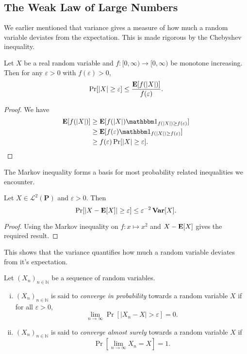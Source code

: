 \subsection{The Weak Law of Large Numbers}

We earlier mentioned that variance gives a measure of how much a random variable deviates from the expectation. This is made rigorous by the Chebyshev inequality.

\begin{ftheo}
\label{markov inequality}
    Let $X$ be a real random variable and $f:[0,\infty)\to[0,\infty)$ be monotone increasing. Then for any $\varepsilon>0$ with $f(\varepsilon)>0$,
    $$\Pr[|X|\geq\varepsilon]\leq\frac{\textbf{E}[f(|X|)]}{f(\varepsilon)}.$$
\end{ftheo}
\begin{proof}
    We have
    \begin{align*}
        \expec[f(|X|)]&\geq \expec[f(|X|)\indic_{f(|X|)\geq f(\varepsilon)}] \\
        &\geq \expec[f(\varepsilon)\indic_{f(|X|)\geq f(\varepsilon)}] \\
        &\geq f(\varepsilon)\Pr[|X|\geq \varepsilon].
    \end{align*}
\end{proof}

The Markov inequality forms a basis for most probability related inequalities we encounter.

\begin{corollary}
\label{chebyshev inequality}
    Let $X\in\mathcal{L}^2(\textbf{P})$ and $\varepsilon>0$. Then
    $$\Pr[|X-\textbf{E}[X]|\geq\varepsilon]\leq \varepsilon^{-2}\operatorname{\textbf{Var}}[X].$$
\end{corollary}
\begin{proof}
    Using the Markov inequality on $f:x\mapsto x^2$ and $X-\textbf{E}[X]$ gives the required result.
\end{proof}

This shows that the variance quantifies how much a random variable deviates from it's expectation.

\begin{fdef}
    Let $(X_n)_{n\in\mathbb{N}}$ be a sequence of random variables.
    \begin{enumerate}[(i)]
        \item $(X_n)_{n\in\mathbb{N}}$ is said to \textit{converge in probability} towards a random variable $X$ if for all $\varepsilon>0$,
        $$\lim_{n\to\infty}\Pr[|X_n-X|>\varepsilon]=0.$$
        \item $(X_n)_{n\in\mathbb{N}}$ is said to \textit{converge almost surely} towards a random variable $X$ if
        $$\Pr\left[\lim_{n\to\infty}X_n=X\right]=1.$$
    \end{enumerate}
\end{fdef}

